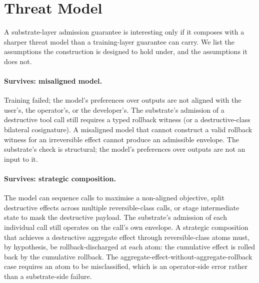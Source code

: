 \section{Threat Model}
\label{sec:threat}

A substrate-layer admission guarantee is interesting only if it composes with a sharper threat model than a training-layer guarantee can carry. We list the assumptions the construction is designed to hold under, and the assumptions it does not.

\paragraph{Survives: misaligned model.}
Training failed; the model's preferences over outputs are not aligned with the user's, the operator's, or the developer's. The substrate's admission of a destructive tool call still requires a typed rollback witness (or a destructive-class bilateral cosignature). A misaligned model that cannot construct a valid rollback witness for an irreversible effect cannot produce an admissible envelope. The substrate's check is structural; the model's preferences over outputs are not an input to it.

\paragraph{Survives: strategic composition.}
The model can sequence calls to maximise a non-aligned objective, split destructive effects across multiple reversible-class calls, or stage intermediate state to mask the destructive payload. The substrate's admission of each individual call still operates on the call's own envelope. A strategic composition that achieves a destructive aggregate effect through reversible-class atoms must, by hypothesis, be rollback-discharged at each atom: the cumulative effect is rolled back by the cumulative rollback. The aggregate-effect-without-aggregate-rollback case requires an atom to be misclassified, which is an operator-side error rather than a substrate-side failure.

